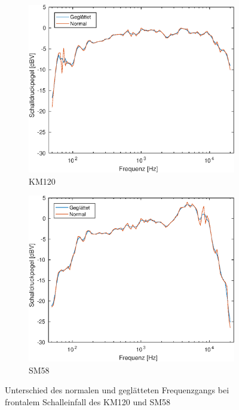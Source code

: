 \begin{figure}[bth]
    \centering
    \begin{subfigure}{.5\textwidth}
        \centering
        \caption{KM120}
        \includegraphics[width=0.95\linewidth]{Figures/km120_0_movmean}
    \end{subfigure}%
    \begin{subfigure}{.5\textwidth}
        \centering
        \caption{SM58}
        \includegraphics[width=0.95\linewidth]{Figures/sm58_0_movmean}
    \end{subfigure}
    \caption{Unterschied des normalen und geglätteten Frequenzgangs bei frontalem Schalleinfall des KM120 und SM58}
    \label{fig:freq_movmean}
\end{figure}

